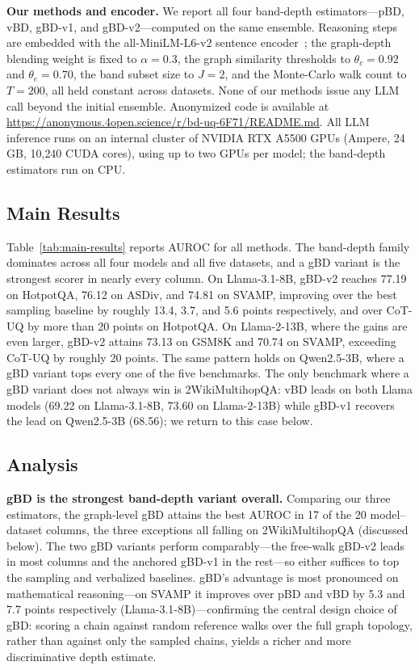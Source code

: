 \documentclass[twoside]{article}
\begin{document}
\textbf{Our methods and encoder.} We report all four band-depth estimators---pBD,
vBD, gBD-v1, and gBD-v2---computed on the same ensemble. Reasoning steps are
embedded with the all-MiniLM-L6-v2 sentence encoder~\citep{reimers2019sentencebert};
the graph-depth blending weight is fixed to $\alpha = 0.3$, the graph similarity
thresholds to $\theta_c = 0.92$ and $\theta_e = 0.70$, the band subset size to
$J = 2$, and the Monte-Carlo walk count to $T = 200$, all held constant across
datasets. None of our methods issue any LLM call beyond the initial ensemble.
Anonymized code is available at
\url{https://anonymous.4open.science/r/bd-uq-6F71/README.md}.
All LLM inference runs on an internal cluster of NVIDIA RTX A5500 GPUs (Ampere,
24\,GB, 10{,}240 CUDA cores), using up to two GPUs per model; the band-depth
estimators run on CPU.

\subsection{Main Results}
\label{sec:exp:main}

Table~\ref{tab:main-results} reports AUROC for all methods. The band-depth family
dominates across all four models and all five datasets, and a gBD variant is the
strongest scorer in nearly every column. On Llama-3.1-8B, gBD-v2 reaches 77.19 on
HotpotQA, 76.12 on ASDiv, and 74.81 on SVAMP, improving over the best sampling
baseline by roughly 13.4, 3.7, and 5.6 points respectively, and over CoT-UQ by more
than 20 points on HotpotQA. On Llama-2-13B, where the gains are
even larger, gBD-v2 attains 73.13 on GSM8K and 70.74 on SVAMP, exceeding CoT-UQ
by roughly 20 points. The same pattern holds on Qwen2.5-3B, where a gBD variant
tops every one of the five benchmarks. The only benchmark where a gBD variant does
not always win is 2WikiMultihopQA: vBD leads on both Llama models (69.22 on
Llama-3.1-8B, 73.60 on Llama-2-13B) while gBD-v1 recovers the lead on Qwen2.5-3B
(68.56); we return to this case below.

\subsection{Analysis}
\label{sec:exp:analysis}

\textbf{gBD is the strongest band-depth variant overall.} Comparing our three
estimators, the graph-level gBD attains the best AUROC in 17 of the 20
model--dataset columns, the three exceptions all falling on 2WikiMultihopQA
(discussed below). The two gBD variants perform comparably---the free-walk gBD-v2
leads in most columns and the anchored gBD-v1 in the rest---so either suffices to
top the sampling and verbalized baselines. gBD's advantage is most pronounced on
mathematical reasoning---on SVAMP it improves over pBD and vBD by 5.3 and 7.7
points respectively (Llama-3.1-8B)---confirming the central design choice of gBD:
scoring a chain against random reference walks over the full graph topology,
rather than against only the sampled chains, yields a richer and more
discriminative depth estimate.
\end{document}
